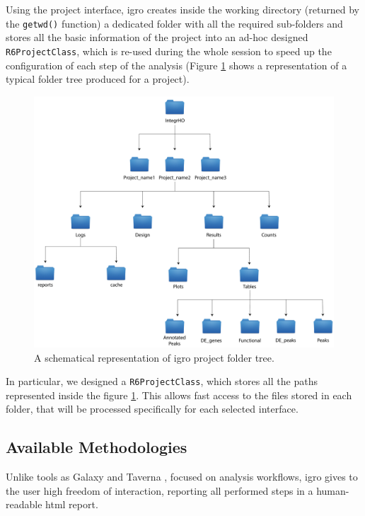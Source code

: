 Using the project interface, \gls{igro} creates inside the working directory (returned by the \lstinline!getwd()! function) a dedicated folder with all the required sub-folders and stores all the basic information of the project into an ad-hoc designed \lstinline!R6ProjectClass!, which is re-used during the whole session to speed up the configuration of each step of the analysis (Figure \ref{fig:integrhotree} shows a representation of a typical folder tree produced for a project).

\begin{figure}[ht]
\centering
\includegraphics[width=\textwidth, keepaspectratio]{img/integrho/project_folder.pdf}
\caption[\gls{igro} folder tree]{A schematical representation of \gls{igro} project folder tree.}
\label{fig:integrhotree}
\end{figure}

In particular, we designed a \lstinline!R6ProjectClass!, which stores all the paths represented inside the figure \ref{fig:integrhotree}.
This allows fast access to the files stored in each folder, that will be processed specifically for each selected interface.


\subsection{Available Methodologies}

Unlike tools as Galaxy \cite{Hillman-Jackson2012} and Taverna \cite{Wolstencroft2013}, focused on analysis workflows, \gls{igro} gives to the user high freedom of interaction, reporting all performed steps in a human-readable \gls{html} report.
 
